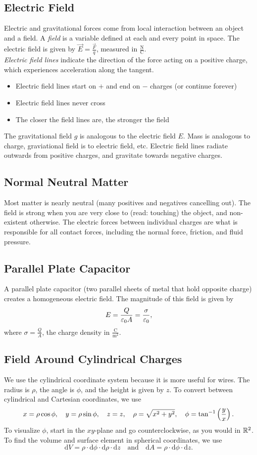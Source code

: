 \documentclass[class=article, crop=false]{standalone}
\begin{document}
  \subsection{Electric Field}
  Electric and gravitational forces come from local interaction between an object and a field. A \emph{field} is a variable defined at each and every point in space. The electric field is given by $\vec{E} = \frac{\vec{F}}{q}$, measured in $\frac{\mathrm{N}}{\mathrm{C}}$. \\[10pt]
  \emph{Electric field lines} indicate the direction of the force acting on a positive charge, which experiences acceleration along the tangent.
  \begin{itemize}
    \item Electric field lines start on $+$ and end on $-$ charges (or continue forever)
    \item Electric field lines never cross
    \item The closer the field lines are, the stronger the field
  \end{itemize}
  The gravitational field $g$ is analogous to the electric field $E$. Mass is analogous to charge, graviational field is to electric field, etc. Electric field lines radiate outwards from positive charges, and gravitate towards negative charges.
  \subsection{Normal Neutral Matter}
  Most matter is nearly neutral (many positives and negatives cancelling out). The field is strong when you are very close to (read: touching) the object, and non-existent otherwise. The electric forces between individual charges are what is responsible for all contact forces, including the normal force, friction, and fluid pressure.
  \subsection{Parallel Plate Capacitor}
  A parallel plate capacitor (two parallel sheets of metal that hold opposite charge) creates a homogeneous electric field. The magnitude of this field is given by 
  \[
    E = \frac{Q}{\varepsilon_0A} = \frac{\sigma}{\varepsilon_0},
  \]
  where $\sigma = \frac{Q}{A}$, the charge density in $\frac{\mathrm{C}}{\mathrm{m}^2}$.
  \subsection{Field Around Cylindrical Charges}
  We use the cylindrical coordinate system because it is more useful for wires. The radius is $\rho$, the angle is $\phi$, and the height is given by $z$. To convert between cylindrical and Cartesian coordinates, we use
  \[
    x = \rho\cos\phi, \quad y = \rho\sin\phi, \quad z = z, \quad \rho = \sqrt{x^2+y^2}, \quad \phi = \tan^{-1} \left( \frac{y}{x} \right).
  \]
  To visualize $\phi$, start in the $xy$-plane and go counterclockwise, as you would in $\mathbb{R}^2$. To find the volume and surface element in spherical coordinates, we use
  \[
    \mathrm{d}V = \rho\cdot \mathrm{d}\phi\cdot \mathrm{d}\rho\cdot \mathrm{d}z \quad \text{and}\quad \mathrm{d}A = \rho\cdot \mathrm{d}\phi\cdot \mathrm{d}z.
  \]
\end{document}
